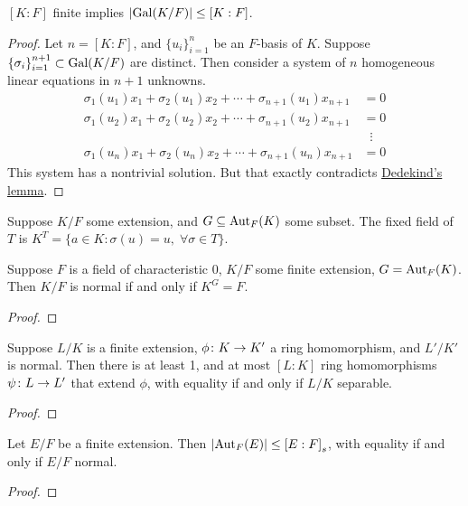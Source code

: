 \begin{theorem}
    \([K:F]\) finite implies \(\abs{\operatorname{Gal}(K/F)} \leq [K:F]\).
\end{theorem}
\begin{proof}
    Let \(n = [K:F]\), and \({\{u_i\}}_{i=1}^n\) be an \(F\)-basis of \(K\).
    Suppose \({\{\sigma_i\}}_{i=1}^{n+1} \subset \operatorname{Gal}(K/F)\) are distinct.
    Then consider a system of \(n\) homogeneous linear equations in \(n+1\) unknowns.
    \begin{align*}
        \sigma_1(u_1)x_1 + \sigma_2(u_1)x_2  + \cdots + \sigma_{n+1}(u_1)x_{n+1} &= 0 \\
        \sigma_1(u_2)x_1 + \sigma_2(u_2)x_2  + \cdots + \sigma_{n+1}(u_2)x_{n+1} &= 0 \\
        &\;\;\vdots \\
        \sigma_1(u_n)x_1 + \sigma_2(u_n)x_2  + \cdots + \sigma_{n+1}(u_n)x_{n+1} &= 0
    \end{align*}
    This system has a nontrivial solution.
    But that exactly contradicts \hyperref[lem:dedekind]{Dedekind's lemma}.
\end{proof}

\begin{definition}
    Suppose \(K/F\) some extension, and \(G \subseteq \operatorname{Aut}_F(K)\) some subset.
    The fixed field of \(T\) is
    \(K^T =\{a \in K: \sigma(u) = u,\; \forall \sigma \in T\}\).
\end{definition}
\begin{proposition}
    Suppose \(F\) is a field of characteristic 0,
    \(K/F\) some finite extension, \(G = \operatorname{Aut}_F(K)\).
    Then \(K/F\) is normal if and only if \(K^G = F\).
\end{proposition}
\begin{proof}
\end{proof}
\begin{proposition}
    Suppose \(L/K\) is a finite extension,
    \(\phi\colon K\to K'\) a ring homomorphism,
    and \(L'/K'\) is normal.
    Then there is at least 1, and at most \([L:K]\) ring homomorphisms
    \(\psi\colon L\to L'\) that extend \(\phi\),
    with equality if and only if \(L/K\) separable.
\end{proposition}
\begin{proof}
\end{proof}
\begin{proposition}
    Let \(E/F\) be a finite extension.
    Then \(\abs{\operatorname{Aut}_F(E)} \leq {[E:F]}_s\),
    with equality if and only if \(E/F\) normal.
\end{proposition}
\begin{proof}
\end{proof}

